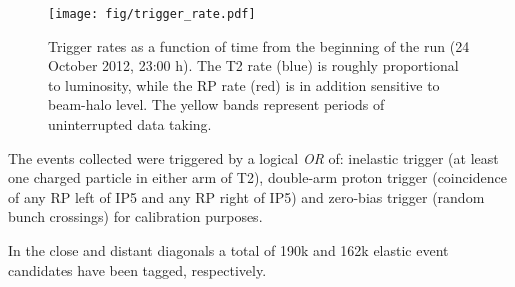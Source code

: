 \begin{figure*}
\begin{center}
\texttt{[image: fig/trigger\_rate.pdf]}
\caption{%
Trigger rates as a function of time from the beginning of the run (24 October 2012, 23:00 h). The T2 rate (blue) is roughly proportional to luminosity, while the RP rate (red) is in addition sensitive to beam-halo level. The yellow bands represent periods of uninterrupted data taking.
}
\label{fig:overview}
\end{center}
\end{figure*}

The events collected were triggered by a logical \textit{OR} of: inelastic 
trigger (at least one charged particle in either arm of T2), double-arm proton trigger 
(coincidence of any RP left of IP5 and any RP right of IP5) and zero-bias trigger (random bunch crossings) for calibration purposes.

In the close and distant diagonals a total of 190k and 162k elastic event candidates have been tagged, respectively.
\fi
